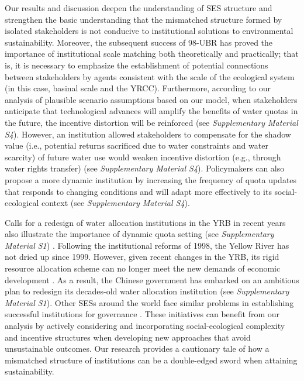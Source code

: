 Our results and discussion deepen the understanding of SES structure and strengthen the basic understanding that the mismatched structure formed by isolated stakeholders is not conducive to institutional solutions to environmental sustainability.
Moreover, the subsequent success of 98-UBR has proved the importance of institutional scale matching both theoretically and practically; that is, it is necessary to emphasize the establishment of potential connections between stakeholders by agents consistent with the scale of the ecological system (in this case, basinal scale and the YRCC).
Furthermore, according to our analysis of plausible scenario assumptions based on our model, when stakeholders anticipate that technological advances will amplify the benefits of water quotas in the future, the incentive distortion will be reinforced (see \textit{Supplementary Material S4}).
However, an institution allowed stakeholders to compensate for the shadow value (i.e., potential returns sacrificed due to water constraints and water scarcity) \cite{howarth2002} of future water use would weaken incentive distortion (e.g., through water rights transfer) (see \textit{Supplementary Material S4}).
Policymakers can also propose a more dynamic institution by increasing the frequency of quota updates that responds to changing conditions and will adapt more effectively to its social-ecological context (see \textit{Supplementary Material S4}).

Calls for a redesign of water allocation institutions in the YRB in recent years also illustrate the importance of dynamic quota setting (see \textit{Supplementary Material S1}) \cite{yu2019}. Following the institutional reforms of 1998, the Yellow River has not dried up since 1999. However, given recent changes in the YRB, its rigid resource allocation scheme can no longer meet the new demands of economic development \cite{wang2019a}. As a result, the Chinese government has embarked on an ambitious plan to redesign its decades-old water allocation institution (see \textit{Supplementary Material S1}). Other SESs around the world face similar problems in establishing successful institutions for governance \cite{cumming2020b, muneepeerakul2017, cumming2020a, leslie2015}. These initiatives can benefit from our analysis by actively considering and incorporating social-ecological complexity and incentive structures when developing new approaches that avoid unsustainable outcomes. Our research provides a cautionary tale of how a mismatched structure of institutions can be a double-edged sword when attaining sustainability.
